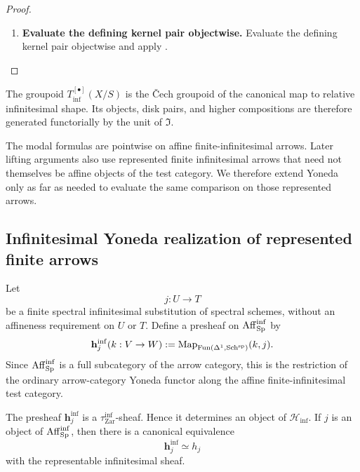 \begin{proof}
\leavevmode
\begin{enumerate}[label=\textup{(\arabic*)}]
    \item \textbf{Evaluate the defining kernel pair objectwise.}
    Evaluate the defining kernel pair objectwise and apply .
\end{enumerate}
\end{proof}

\begin{remark}
\label{rem:infinitesimal-equality-reduction}
The groupoid \(T_{\inf}^{[\bullet]}(X/S)\) is the \v{C}ech groupoid of
the canonical map to relative infinitesimal shape. Its objects, disk pairs,
and higher compositions are therefore generated functorially by the unit of
\(\Im\).
\end{remark}
The modal formulas are pointwise on affine finite-infinitesimal arrows. Later
lifting arguments also use represented finite infinitesimal arrows that need
not themselves be affine objects of the test category. We therefore extend
Yoneda only as far as needed to evaluate the same comparison on those
represented arrows.

\subsection{Infinitesimal Yoneda realization of represented finite arrows}

\begin{construction}
\label{con:infinitesimal-yoneda-realization}
Let
\[
    j:U\longrightarrow T
\]
be a finite spectral infinitesimal substitution of spectral schemes, without
an affineness requirement on \(U\) or \(T\). Define a presheaf on
\(\operatorname{Aff}_{\operatorname{Sp}}^{\inf}\) by
\[
    \mathbf h^{\inf}_j(k:V\to W)
    :=
    \operatorname{Map}_{\operatorname{Fun}(\Delta^1,\operatorname{Sch}^{\mathrm{sp}})}(k,j).
\]
Since \(\operatorname{Aff}_{\operatorname{Sp}}^{\inf}\) is a full subcategory of the arrow category, this
is the restriction of the ordinary arrow-category Yoneda functor along the
affine finite-infinitesimal test category.
\end{construction}

\begin{proposition}
\label{prop:infinitesimal-yoneda-realization-sheaf}
The presheaf \(\mathbf h^{\inf}_j\) is a
\(\tau^{\inf}_{\mathrm{Zar}}\)-sheaf. Hence it determines an object of
\(\mathcal H_{\inf}\). If \(j\) is an object of \(\operatorname{Aff}_{\operatorname{Sp}}^{\inf}\),
then there is a canonical equivalence
\[
    \mathbf h^{\inf}_j\simeq h_j
\]
with the representable infinitesimal sheaf.
\end{proposition}

